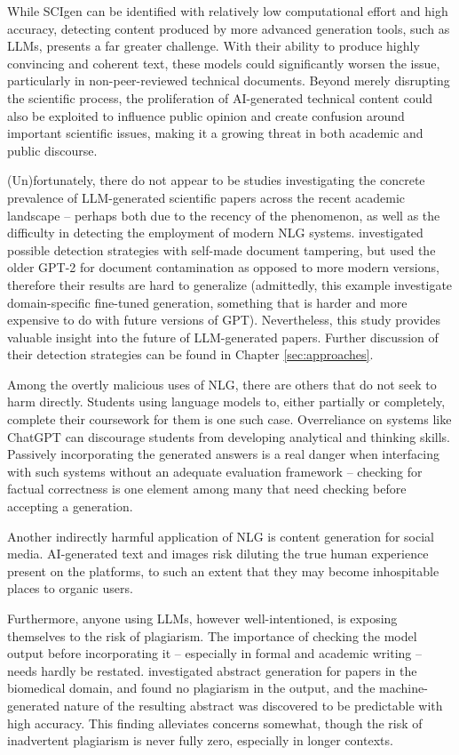 While SCIgen can be identified with relatively low computational effort and high accuracy, detecting content produced by more advanced generation tools, such as LLMs, presents a far greater challenge.
With their ability to produce highly convincing and coherent text, these models could significantly worsen the issue, particularly in non-peer-reviewed technical documents.
Beyond merely disrupting the scientific process, the proliferation of AI-generated technical content could also be exploited to influence public opinion and create confusion around important scientific issues, making it a growing threat in both academic and public discourse.

(Un)fortunately, there do not appear to be studies investigating the concrete prevalence of LLM-generated scientific papers across the recent academic landscape -- perhaps both due to the recency of the phenomenon, as well as the difficulty in detecting the employment of modern NLG systems.
\citet{rodriguez2022cross} investigated possible detection strategies with self-made document tampering, but used the older GPT-2 for document contamination as opposed to more modern versions, therefore their results are hard to generalize
(admittedly, this example investigate domain-specific fine-tuned generation, something that is harder and more expensive to do with future versions of GPT).
Nevertheless, this study provides valuable insight into the future of LLM-generated papers. Further discussion of their detection strategies can be found in Chapter \ref{sec:approaches}.

Among the overtly malicious uses of NLG, there are others that do not seek to harm directly.
Students using language models to, either partially or completely, complete their coursework for them is one such case.
Overreliance on systems like ChatGPT can discourage students from developing analytical and thinking skills.
Passively incorporating the generated answers is a real danger when interfacing with such systems without an adequate evaluation framework -- checking for factual correctness is one element among many that need checking before accepting a generation.

Another indirectly harmful application of NLG is content generation for social media.
AI-generated text and images risk diluting the true human experience present on the platforms, to such an extent that they may become inhospitable places to organic users.

Furthermore, anyone using LLMs, however well-intentioned, is exposing themselves to the risk of plagiarism.
The importance of checking the model output before incorporating it -- especially in formal and academic writing -- needs hardly be restated.
\citet{gao2022comparing} investigated abstract generation for papers in the biomedical domain, and found no plagiarism in the output, and the machine-generated nature of the resulting abstract was discovered to be predictable with high accuracy.
This finding alleviates concerns somewhat, though the risk of inadvertent plagiarism is never fully zero, especially in longer contexts.